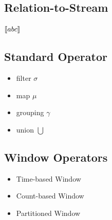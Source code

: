 \subsection*{Relation-to-Stream}



$[\![abc]\!]$


\subsection{Standard Operator}
\begin{itemize}
	\item filter $\sigma$
	\item map $\mu$
	\item grouping $\gamma$  
	\item union $\bigcup$
\end{itemize}

\subsection{Window Operators}
\begin{itemize}
\item Time-based Window
\item Count-based Window
\item Partitioned Window
\end{itemize}



